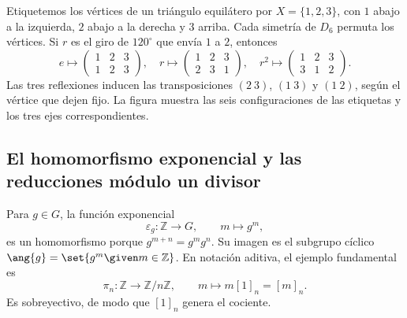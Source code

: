 \begin{ejem}
Etiquetemos los vértices de un triángulo equilátero por $X=\{1,2,3\}$, con $1$ abajo a la izquierda, $2$ abajo a la derecha y $3$ arriba. Cada simetría de $D_6$ permuta los vértices. Si $r$ es el giro de $120^\circ$ que envía $1$ a $2$, entonces
\[
e\longmapsto\begin{pmatrix}1&2&3\\1&2&3\end{pmatrix},\quad
r\longmapsto\begin{pmatrix}1&2&3\\2&3&1\end{pmatrix},\quad
r^2\longmapsto\begin{pmatrix}1&2&3\\3&1&2\end{pmatrix}.
\]
Las tres reflexiones inducen las transposiciones $(2\ 3)$, $(1\ 3)$ y $(1\ 2)$, según el vértice que dejen fijo. La figura muestra las seis configuraciones de las etiquetas y los tres ejes correspondientes.
\begin{center}\end{center}
\end{ejem}

\subsection{El homomorfismo exponencial y las reducciones módulo un divisor}
Para $g\in G$, la función exponencial
\[
\varepsilon_g:\mathbb Z\to G,\qquad m\mapsto g^m,
\]
es un homomorfismo porque $g^{m+n}=g^mg^n$. Su imagen es el subgrupo cíclico $\ang{g}=\set{g^m\given m\in\mathbb Z}$. En notación aditiva, el ejemplo fundamental es
\[
\pi_n:\mathbb Z\to\mathbb Z/n\mathbb Z,\qquad
m\mapsto m[1]_n=[m]_n.
\]
Es sobreyectivo, de modo que $[1]_n$ genera el cociente.

